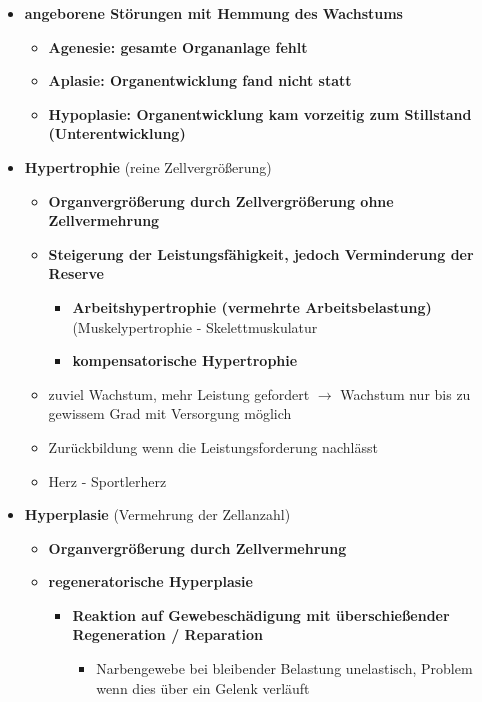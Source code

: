 \begin{itemize}
\begin{itemize}
\begin{itemize}
\begin{itemize}
							\end{itemize}
				\end{itemize}
			\end{itemize}
		\item \textbf{angeborene Störungen mit Hemmung des Wachstums}
			\begin{itemize}
				\item \textbf{Agenesie: gesamte Organanlage fehlt}
				\item \textbf{Aplasie: Organentwicklung fand nicht statt}
				\item \textbf{Hypoplasie: Organentwicklung kam vorzeitig zum Stillstand (Unterentwicklung)}
			\end{itemize}
		\item \textbf{Hypertrophie} (reine Zellvergrößerung)
			\begin{itemize}
				\item \textbf{Organvergrößerung durch Zellvergrößerung ohne Zellvermehrung}
				\item \textbf{Steigerung der Leistungsfähigkeit, jedoch Verminderung der Reserve}
					\begin{itemize}
						\item \textbf{Arbeitshypertrophie (vermehrte Arbeitsbelastung)} (Muskelypertrophie - Skelettmuskulatur
						\item \textbf{kompensatorische Hypertrophie}
					\end{itemize}
				\item zuviel Wachstum, mehr Leistung gefordert $\rightarrow$ Wachstum nur bis zu gewissem Grad mit Versorgung möglich
				\item Zurückbildung wenn die Leistungsforderung nachlässt
				\item Herz - Sportlerherz
			\end{itemize}
		\item \textbf{Hyperplasie} (Vermehrung der Zellanzahl)
			\begin{itemize}
				\item \textbf{Organvergrößerung durch Zellvermehrung}
				\item \textbf{regeneratorische Hyperplasie}
					\begin{itemize}
						\item \textbf{Reaktion auf Gewebeschädigung mit überschießender Regeneration / Reparation}
							\begin{itemize}
								\item Narbengewebe bei bleibender Belastung unelastisch, Problem wenn dies über ein Gelenk verläuft

\end{itemize}
\end{itemize}
\end{itemize}
\end{itemize}
